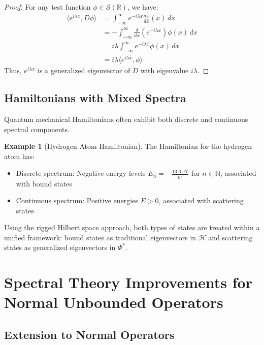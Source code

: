\documentclass[12pt,a4paper]{article}
\theoremstyle{definition}
\newtheorem{example}{Example}
\begin{document}
\begin{proof}
For any test function $\phi \in \mathcal{S}(\mathbb{R})$, we have:
\begin{align}
    \langle e^{i\lambda x}, D\phi \rangle &= \int_{-\infty}^{\infty} e^{-i\lambda x} \frac{d\phi}{dx}(x) \, dx \\
    &= -\int_{-\infty}^{\infty} \frac{d}{dx}(e^{-i\lambda x}) \phi(x) \, dx \\
    &= i\lambda \int_{-\infty}^{\infty} e^{-i\lambda x} \phi(x) \, dx \\
    &= i\lambda \langle e^{i\lambda x}, \phi \rangle
\end{align}
Thus, $e^{i\lambda x}$ is a generalized eigenvector of $D$ with eigenvalue $i\lambda$.
\end{proof}

\subsection{Hamiltonians with Mixed Spectra}

Quantum mechanical Hamiltonians often exhibit both discrete and continuous spectral components.

\begin{example}[Hydrogen Atom Hamiltonian]
The Hamiltonian for the hydrogen atom has:
\begin{itemize}
    \item Discrete spectrum: Negative energy levels $E_n = -\frac{13.6 \text{ eV}}{n^2}$ for $n \in \mathbb{N}$, associated with bound states
    \item Continuous spectrum: Positive energies $E > 0$, associated with scattering states
\end{itemize}

Using the rigged Hilbert space approach, both types of states are treated within a unified framework: bound states as traditional eigenvectors in $\mathcal{H}$ and scattering states as generalized eigenvectors in $\Phi^*$.
\end{example}

\section{Spectral Theory Improvements for Normal Unbounded Operators}

\subsection{Extension to Normal Operators}
\end{document}
